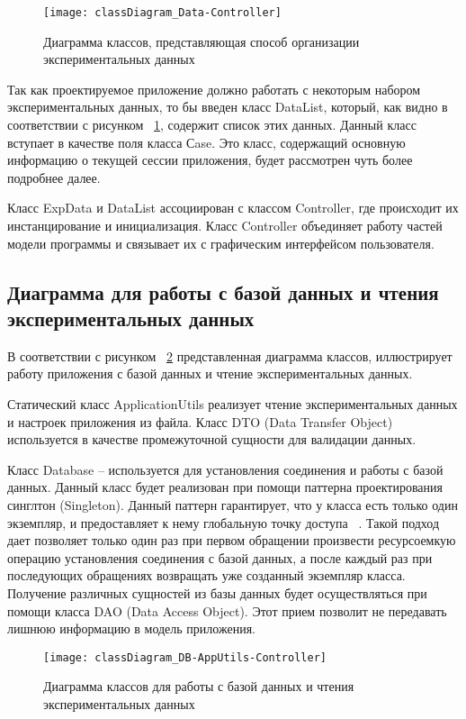 \documentclass[14pt]{extreport}
\begin{document}
\begin{figure}[H]
\centerline{\texttt{[image: classDiagram\_Data-Controller]}}
\caption{Диаграмма классов, представляющая способ организации экспериментальных данных}
\label{fig6}
\end{figure}

Так как проектируемое приложение должно работать с некоторым набором экспериментальных данных, то бы введен класс DataList, который, как видно в соответствии с рисунком ~\ref{fig6}, содержит список этих данных. Данный класс вступает в качестве поля класса Сase. Это класс, содержащий основную информацию о текущей сессии приложения, будет рассмотрен чуть более подробнее далее. 

Класс ExpData и DataList ассоциирован с классом Controller, где происходит их инстанцирование и инициализация. Класс Controller объединяет работу частей модели программы и связывает их с графическим интерфейсом пользователя. 

\subsection{Диаграмма для работы с базой данных и чтения экспериментальных данных}
В соответствии с рисунком ~\ref{fig7} представленная диаграмма классов, иллюстрирует работу приложения с базой данных и чтение экспериментальных данных.

Статический класс ApplicationUtils реализует чтение экспериментальных данных и настроек приложения из файла. Класс DTO (Data Transfer Object) используется в качестве промежуточной сущности для валидации данных.

Класс Database -- используется для установления соединения и работы с базой данных. Данный класс будет реализован при помощи паттерна проектирования синглтон (Singleton). Данный паттерн гарантирует, что у класса есть только один экземпляр, и предоставляет к нему глобальную точку доступа ~\cite{oop}. Такой подход дает позволяет только один раз при первом обращении произвести ресурсоемкую операцию установления соединения с базой данных, а после каждый раз при последующих обращениях возвращать уже созданный экземпляр класса. Получение различных сущностей из базы данных будет осуществляться при помощи класса DAO (Data Access Object). Этот прием позволит не передавать лишнюю информацию в модель приложения.

\begin{figure}[H]
\centerline{\texttt{[image: classDiagram\_DB-AppUtils-Controller]}}
\caption{Диаграмма классов для работы с базой данных и чтения экспериментальных данных}
\label{fig7}
\end{figure}
\end{document}
